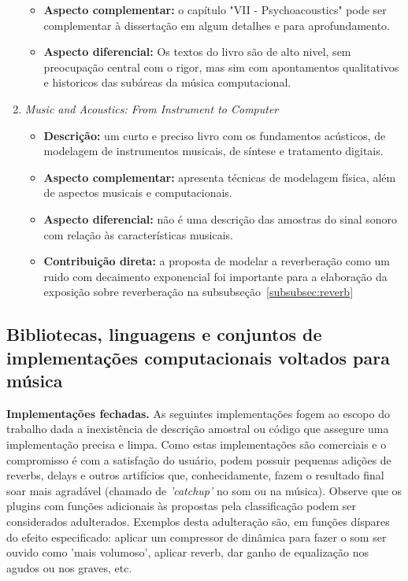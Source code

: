 \begin{enumerate}
\begin{itemize}
            \item {\bf Aspecto complementar:} o capítulo "VII - Psychoacoustics" pode ser complementar à dissertação em algum detalhes e para aprofundamento.
            \item {\bf Aspecto diferencial:} Os textos do livro são de alto nivel, sem preocupação central com o rigor, mas sim com apontamentos qualitativos e historicos das subáreas da música computacional. 
        \end{itemize}
    \item \emph{Music and Acoustics: From Instrument to Computer}
        \begin{itemize}
            \item {\bf Descrição:} um curto e preciso livro com os fundamentos acústicos, de modelagem de instrumentos musicais, de síntese e tratamento digitais.
            \item {\bf Aspecto complementar:} apresenta técnicas de modelagem física, além de aspectos musicais e computacionais.
            \item {\bf Aspecto diferencial:} não é uma descrição das amostras do sinal sonoro com relação às características musicais.
            \item {\bf Contribuição direta:} a proposta de modelar a reverberação como um ruido com decaimento exponencial foi importante para a elaboração da exposição sobre reverberação na subsubseção~\ref{subsubsec:reverb}
        \end{itemize}
\end{enumerate}

\subsection{Bibliotecas, linguagens e conjuntos de implementações computacionais voltados para música}\label{subsec:bibs}
{\bf Implementações fechadas.} As seguintes implementações fogem ao escopo do trabalho dada a inexistência de descrição amostral ou código que assegure uma implementação precisa e limpa. Como estas implementações são comerciais e o compromisso é com a satisfação do usuário, podem possuir pequenas adições de reverbs, delays e outros artifícios que, conhecidamente, fazem o resultado final soar mais agradável (chamado de \emph{'catchup'} no som ou na música). Observe que os plugins com funções adicionais às propostas pela classificação podem ser considerados adulterados. Exemplos desta adulteração são, em funções díspares do efeito especificado: aplicar um compressor de dinâmica para fazer o som ser ouvido como 'mais volumoso', aplicar reverb, dar ganho de equalização nos agudos ou nos graves, etc. 

